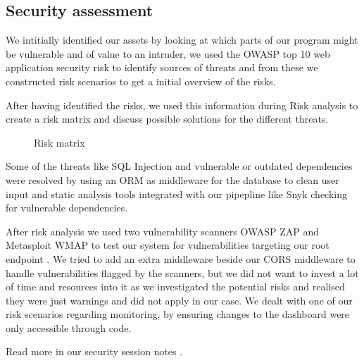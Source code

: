 \subsection{Security assessment}
We intitially identified our assets by looking at which parts of our program might be vulnerable and of value to an intruder, 
we used the OWASP top 10 web application security risk \cite{owasp-top-10} to identify sources of threats and from these we constructed risk scenarios to get a initial overview of the risks.

After having identified the risks, we used this information during Risk analysis to create a risk matrix and discuss possible solutions for the different threats. 


\begin{wrapfigure}{R}{0.38\paperwidth}
    \hspace*{0.35in}
    \caption{Risk matrix}
    \label{fig:Risk-matrix}
\end{wrapfigure}

Some of the threats like SQL Injection and vulnerable or outdated dependencies were resolved by using an ORM \cite{gorm} as middleware for the database to clean user input and static analysis tools integrated with our pipepline like Snyk \cite{snyk} checking for vulnerable dependencies.

After risk analysis we used two vulnerability scanners OWASP ZAP \cite{tool:owasp-zap} and Metasploit \cite{metasploit} WMAP \cite{metasploit-wmap} to test our system for vulnerabilities targeting our root endpoint \cite{minitwit-root-endpoint}.
We tried to add an extra middleware beside our CORS middleware to handle vulnerabilities flagged by the scanners, but we did not want to invest a lot of time and resources into it as we investigated the potential risks and realised they were just warnings and did not apply in our case.
We dealt with one of our risk scenarios regarding monitoring, by ensuring changes to the dashboard were only accessible through code.

Read more in our security session notes \cite{repo:security-session-notes}.
